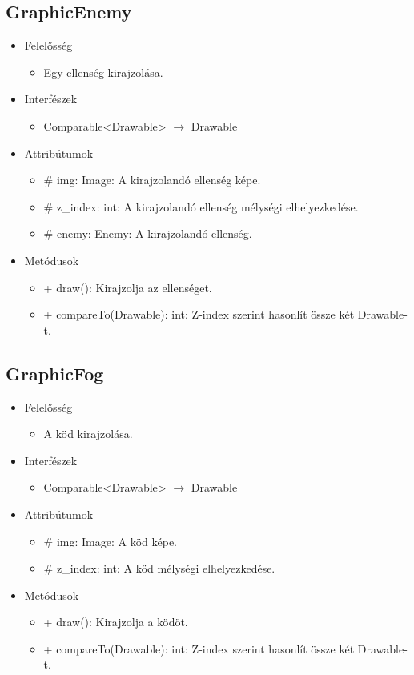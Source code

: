 \subsection{GraphicEnemy}
\begin{itemize}
\item Felelősség
\begin{itemize}
	\item Egy ellenség kirajzolása.
\end{itemize}
\item Interfészek
\begin{itemize}
	\item Comparable<Drawable> $\rightarrow$ Drawable
\end{itemize}
\item Attribútumok
	\begin{itemize}
		\item \# img: Image: A kirajzolandó ellenség képe.
		\item \# z\_index: int: A kirajzolandó ellenség mélységi elhelyezkedése.
		\item \# enemy: Enemy: A kirajzolandó ellenség.
	\end{itemize}
\item Metódusok
	\begin{itemize}
		\item + draw(): Kirajzolja az ellenséget.
		\item + compareTo(Drawable): int: Z-index szerint hasonlít össze két Drawable-t.
	\end{itemize}
\end{itemize}

\subsection{GraphicFog}
\begin{itemize}
\item Felelősség
\begin{itemize}
	\item A köd kirajzolása.
\end{itemize}
\item Interfészek
\begin{itemize}
	\item Comparable<Drawable> $\rightarrow$ Drawable
\end{itemize}
\item Attribútumok
	\begin{itemize}
		\item \# img: Image: A köd képe.
		\item \# z\_index: int: A köd mélységi elhelyezkedése.
	\end{itemize}
\item Metódusok
	\begin{itemize}
		\item + draw(): Kirajzolja a ködöt.
		\item + compareTo(Drawable): int: Z-index szerint hasonlít össze két Drawable-t.
	\end{itemize}
\end{itemize}

